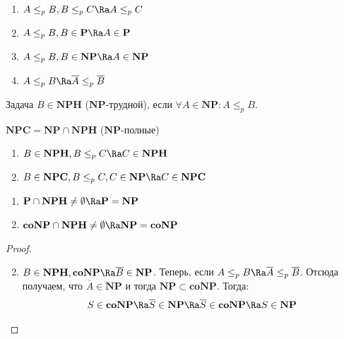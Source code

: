 \begin{note}[Свойства \(\le_p\)]\indent
    \begin{enumerate}
        \item \(A \le_p B, B \le_p C \Ra A \le_p C\)
        \item \(A \le_p B, B \in \mathbf{P} \Ra A \in \mathbf{P}\)
        \item \(A \le_p B, B \in \mathbf{NP} \Ra A \in \mathbf{NP}\)
        \item \(A \le_p B \Ra \overline{A} \le_p \overline{B}\)
    \end{enumerate}
\end{note}

\begin{definition}
    Задача \(B \in \mathbf{NPH}\) (\(\mathbf{NP}\)-трудной), если \(\forall A \in \mathbf{NP}: A \le_p B\).
\end{definition}

\begin{definition}
    \(\mathbf{NPC} = \mathbf{NP} \cap \mathbf{NPH}\) (\(\mathbf{NP}\)-полные)
\end{definition}

\begin{corollary}\indent
    \begin{enumerate}
        \item \(B \in \mathbf{NPH}, B \le_p C \Ra C \in \mathbf{NPH}\)
        \item \(B \in \mathbf{NPC}, B \le_p C, C \in \mathbf{NP} \Ra C \in \mathbf{NPC}\)
    \end{enumerate}
\end{corollary}

\begin{proposition}\indent
    \begin{enumerate}
        \item \(\mathbf{P} \cap \mathbf{NPH} \ne \emptyset \Ra \mathbf{P} = \mathbf{NP}\)
        \item \(\mathbf{coNP} \cap \mathbf{NPH} \ne \emptyset \Ra \mathbf{NP} = \mathbf{coNP}\)
    \end{enumerate}
\end{proposition}
\begin{proof}\indent
    \begin{enumerate}
        \setcounter{enumi}{1}
        \item \(B \in \mathbf{NPH}, \mathbf{coNP} \Ra \overline{B} \in \mathbf{NP}\). Теперь, если \(A \le_p B \Ra \overline{A} \le_p \overline{B}\). Отсюда получаем, что \(\overline{A} \in \mathbf{NP}\) и тогда \(\mathbf{NP} \subset \mathbf{coNP}\). Тогда:
        \[S \in \mathbf{coNP} \Ra \overline{S} \in \mathbf{NP} \Ra \overline{S} \in \mathbf{coNP} \Ra S \in \mathbf{NP}\]
    \end{enumerate}
\end{proof}

